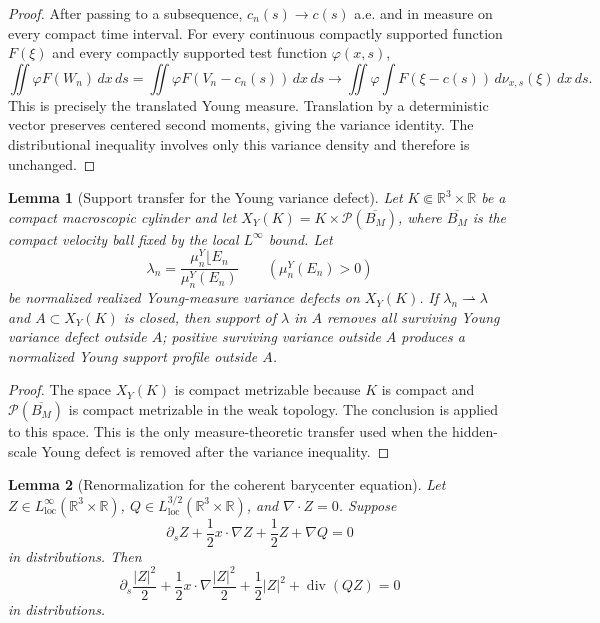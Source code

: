 \documentclass[11pt]{amsart}
\numberwithin{equation}{section}
\theoremstyle{plain}
\newtheorem{lemma}[lemma]{Lemma}
\theoremstyle{definition}
\theoremstyle{remark}
\newcommand{\loc}{\mathrm{loc}}
\newcommand{\divergence}{\operatorname{div}}
\begin{document}
\begin{proof}
After passing to a subsequence, \(c_n(s)\to c(s)\) a.e. and in measure on every
compact time interval.  For every continuous compactly supported function
\(F(\xi)\) and every compactly supported test function \(\varphi(x,s)\),
\[
   \iint \varphi F(W_n)\,dx\,ds
   =
   \iint \varphi F(V_n-c_n(s))\,dx\,ds
   \to
   \iint\varphi\int F(\xi-c(s))\,d\nu_{x,s}(\xi)\,dx\,ds .
\]
This is precisely the translated Young measure.  Translation by a deterministic
vector preserves centered second moments, giving the variance identity.  The
distributional inequality involves only this variance density and therefore is
unchanged.
\end{proof}

\begin{lemma}[Support transfer for the Young variance defect]
\label{lem:young-variance-support-transfer}
Let \(K\Subset\mathbb R^3\times\mathbb R\) be a compact macroscopic cylinder
and let \(X_Y(K)=K\times\mathcal P(\overline{B_M})\), where
\(\overline{B_M}\) is the compact velocity ball fixed by the local
\(L^\infty\) bound.  Let
\[
   \lambda_n=\frac{\mu_n^Y\lfloor E_n}{\mu_n^Y(E_n)}
   \qquad(\mu_n^Y(E_n)>0)
\]
be normalized realized Young-measure variance defects on \(X_Y(K)\).  If
\(\lambda_n\rightharpoonup\lambda\) and \(A\subset X_Y(K)\) is closed, then
support of \(\lambda\) in \(A\) removes all surviving Young variance defect
outside \(A\); positive surviving variance outside \(A\) produces a normalized
Young support profile outside \(A\).
\end{lemma}

\begin{proof}
The space \(X_Y(K)\) is compact metrizable because \(K\) is compact and
\(\mathcal P(\overline{B_M})\) is compact metrizable in the weak topology.
The conclusion is  applied to this
space.  This is the only measure-theoretic transfer used when the hidden-scale
Young defect is removed after the variance inequality.
\end{proof}

\begin{lemma}[Renormalization for the coherent barycenter equation]
\label{lem:coherent-barycenter-renormalization}
Let \(Z\in L^\infty_{\loc}(\mathbb R^3\times\mathbb R)\),
\(Q\in L^{3/2}_{\loc}(\mathbb R^3\times\mathbb R)\), and
\(\nabla\cdot Z=0\).  Suppose
\[
   \partial_s Z+\frac12 x\cdot\nabla Z+\frac12 Z+\nabla Q=0
\]
in distributions.  Then
\[
   \partial_s\frac{|Z|^2}{2}
   +\frac12x\cdot\nabla\frac{|Z|^2}{2}
   +\frac12|Z|^2
   +\divergence(QZ)=0
\]
in distributions.
\end{lemma}
\end{document}
